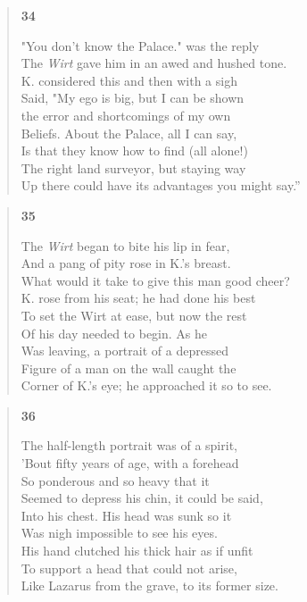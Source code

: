 \documentclass{article}
\begin{document}
\begin{verse}
  \begin{center}
    \textbf{34} \\
  \end{center}
  "You don't know the Palace." was the reply \\
  The \textit{Wirt} gave him in an awed and hushed tone. \\
  K. considered this and then with a sigh \\
  Said, "My ego is big, but I can be shown \\
  the error and shortcomings of my own \\
  Beliefs. About the Palace, all I can say, \\
  Is that they know how to find (all alone!) \\
  The right land surveyor, but staying way \\
  Up there could have its advantages you might say.''
\end{verse}

\begin{verse}
  \begin{center}
    \textbf{35} \\
  \end{center}
  The \textit{Wirt} began to bite his lip in fear, \\
  And a pang of pity rose in K.'s breast. \\
  What would it take to give this man good cheer? \\
  K. rose from his seat; he had done his best \\
  To set the Wirt at ease, but now the rest \\
  Of his day needed to begin. As he \\
  Was leaving, a portrait of a depressed \\
  Figure of a man on the wall caught the \\
  Corner of K.'s eye; he approached it so to see.
\end{verse}

\newpage
\begin{verse}
  \begin{center}
    \textbf{36} \\
  \end{center}
  The half-length portrait was of a spirit,\\
  'Bout fifty years of age, with a forehead\\
  So ponderous and so heavy that it\\
  Seemed to depress his chin, it could be said,\\
  Into his chest. His head was sunk so it  \\
  Was nigh impossible to see his eyes.\\
  His hand clutched his thick hair as if unfit\\
  To support a head that could not arise,\\
  Like Lazarus from the grave, to its former size.
\end{verse}
\end{document}

